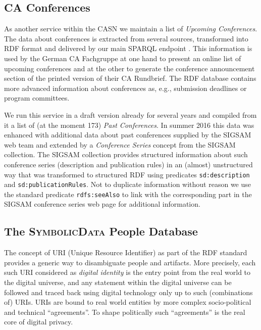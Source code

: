 \documentclass{mathincs}
\newcommand{\SD}{\textsc{Symbo\-lic\-Data}}
\begin{document}
\subsection{CA Conferences}

As another service within the CASN we maintain a list of \emph{Upcoming
  Conferences}.  The data about conferences is extracted from several sources,
transformed into RDF format and delivered by our main SPARQL endpoint
\cite{sdsparql}.  This information is used by the German CA Fachgruppe at one
hand to present an online list of upcoming conferences and at the other to
generate the conference announcement section of the printed version of their
CA Rundbrief.  The RDF database contains more advanced information about
conferences as, e.g., submission deadlines or program committees.

We run this service in a draft version already for several years and compiled
from it a list of (at the moment 173) \emph{Past Conferences}. In summer 2016
this data was enhanced with additional data about past conferences supplied by
the SIGSAM web team and extended by a \emph{Conference Series} concept from
the SIGSAM collection.  The SIGSAM collection provides structured information
about such conference series (description and publication rules) in an
(almost) unstructured way that was transformed to structured RDF using
predicates \texttt{sd:description} and \texttt{sd:publicationRules}.  Not to
duplicate information without reason we use the standard predicate
\texttt{rdfs:seeAlso} to link with the corresponding part in the SIGSAM
conference series web page for additional information.

\subsection{The {\SD} People Database}

The concept of URI (Unique Resource Identifier) as part of the RDF standard
provides a generic way to disambiguate people and artifacts.  More precisely,
each such URI considered as \emph{digital identity} is the entry point from
the real world to the digital universe, and any statement within the digital
universe can be followed and traced back using digital technology only up to
such (combinations of) URIs. URIs are bound to real world entities by more
complex socio-political and technical ``agreements''. To shape politically
such ``agreements'' is the real core of digital privacy.
\end{document}
